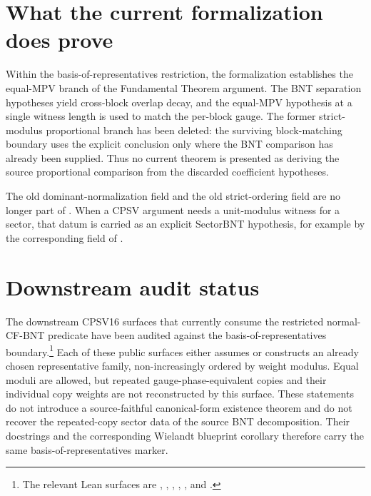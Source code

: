\documentclass{article}
\begin{document}
\section{What the current formalization does prove}

Within the basis-of-representatives restriction, the formalization establishes
the equal-MPV branch of the Fundamental Theorem argument. The BNT separation
hypotheses yield cross-block overlap decay, and the equal-MPV hypothesis at
a single witness length is used to match the per-block gauge. The former
strict-modulus proportional branch has been deleted: the surviving block-matching
boundary uses the explicit conclusion
 only where the BNT comparison
has already been supplied. Thus no current theorem is presented as deriving
the source proportional comparison from the discarded coefficient hypotheses.

The old dominant-normalization field and the old strict-ordering field are no
longer part of . When a CPSV argument needs a
unit-modulus witness for a sector, that datum is carried as an explicit
SectorBNT hypothesis, for example by the corresponding field of
.

\section{Downstream audit status}

The downstream CPSV16 surfaces that currently consume the restricted
normal-CF-BNT predicate have been audited against the basis-of-representatives
boundary.\footnote{The relevant Lean surfaces are
    ,
    ,
    ,
    ,
    ,
    and
    .}
Each of these public surfaces either assumes or constructs an already chosen
representative family, non-increasingly ordered by weight modulus. Equal
moduli are allowed, but repeated gauge-phase-equivalent copies and their
individual copy weights are not reconstructed by this surface. These statements
do not introduce a source-faithful canonical-form existence theorem and do not
recover the repeated-copy sector data of the source BNT decomposition. Their
docstrings and the corresponding Wielandt blueprint corollary therefore carry
the same basis-of-representatives marker.
\end{document}
